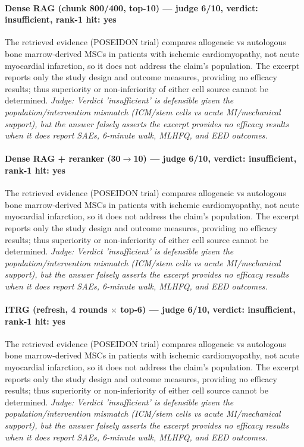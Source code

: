 \documentclass[sigconf, review, anonymous]{acmart}
\begin{document}
\paragraph{Dense RAG (chunk 800/400, top-10) --- judge 6/10, verdict: insufficient, rank-1 hit: yes}
\noindent The retrieved evidence (POSEIDON trial) compares allogeneic vs autologous bone marrow-derived MSCs in patients with ischemic cardiomyopathy, not acute myocardial infarction, so it does not address the claim's population. The excerpt reports only the study design and outcome measures, providing no efficacy results; thus superiority or non-inferiority of either cell source cannot be determined.
\noindent\small\textit{Judge: Verdict 'insufficient' is defensible given the population/intervention mismatch (ICM/stem cells vs acute MI/mechanical support), but the answer falsely asserts the excerpt provides no efficacy results when it does report SAEs, 6-minute walk, MLHFQ, and EED outcomes.}
\paragraph{Dense RAG + reranker (30$\to$10) --- judge 6/10, verdict: insufficient, rank-1 hit: yes}
\noindent The retrieved evidence (POSEIDON trial) compares allogeneic vs autologous bone marrow-derived MSCs in patients with ischemic cardiomyopathy, not acute myocardial infarction, so it does not address the claim's population. The excerpt reports only the study design and outcome measures, providing no efficacy results; thus superiority or non-inferiority of either cell source cannot be determined.
\noindent\small\textit{Judge: Verdict 'insufficient' is defensible given the population/intervention mismatch (ICM/stem cells vs acute MI/mechanical support), but the answer falsely asserts the excerpt provides no efficacy results when it does report SAEs, 6-minute walk, MLHFQ, and EED outcomes.}
\paragraph{ITRG (refresh, 4 rounds $\times$ top-6) --- judge 6/10, verdict: insufficient, rank-1 hit: yes}
\noindent The retrieved evidence (POSEIDON trial) compares allogeneic vs autologous bone marrow-derived MSCs in patients with ischemic cardiomyopathy, not acute myocardial infarction, so it does not address the claim's population. The excerpt reports only the study design and outcome measures, providing no efficacy results; thus superiority or non-inferiority of either cell source cannot be determined.
\noindent\small\textit{Judge: Verdict 'insufficient' is defensible given the population/intervention mismatch (ICM/stem cells vs acute MI/mechanical support), but the answer falsely asserts the excerpt provides no efficacy results when it does report SAEs, 6-minute walk, MLHFQ, and EED outcomes.}
\end{document}
